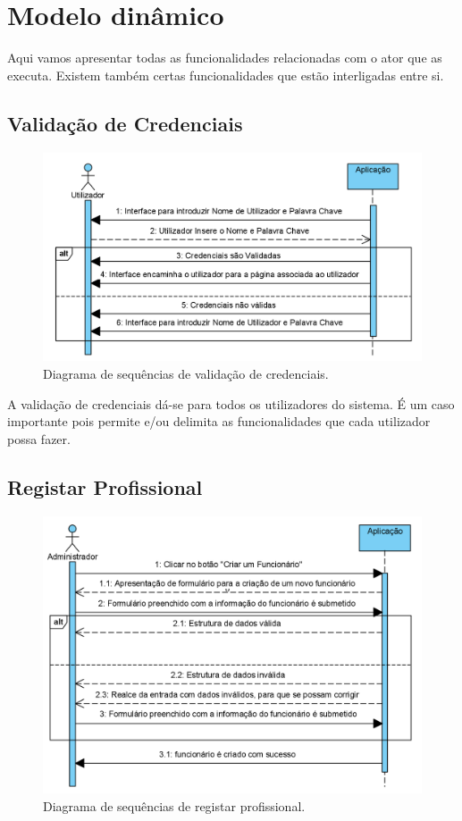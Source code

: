 \documentclass[11pt,a4paper,twoside]{report}
\begin{document}
\chapter{Modelo dinâmico}


Aqui vamos apresentar todas as funcionalidades relacionadas com o ator que as executa. Existem também certas funcionalidades que estão interligadas entre si. 


\section{Validação de Credenciais }

\begin{figure}[H]
	\centering
	\includegraphics[width=0.7\linewidth]{image/SequencialDiagramsImages/Validar_credenciais}
	\caption [Diagrama de sequências de validação de credenciais.] {Diagrama de sequências de validação de credenciais.}
	\label{fig:validarcredenciaisF}
\end{figure}

A validação de credenciais dá-se para todos os utilizadores do sistema.
É um caso importante pois permite e/ou delimita as funcionalidades que cada utilizador possa fazer. 

\section{Registar Profissional}

\begin{figure}[H]
	\centering
	\includegraphics[width=0.7\linewidth]{image/SequencialDiagramsImages/Registar_pessoal}
	\caption [Diagrama de sequências de registar profissional.] {Diagrama de sequências de registar profissional.}
	\label{fig:registarpessoalF}
\end{figure}
\end{document}
